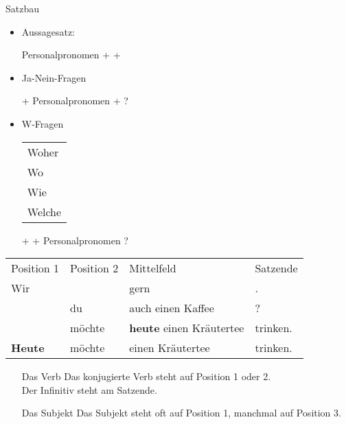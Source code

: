 \begin{syntax}{Satzbau}{}
\begin{itemize}
	\item Aussagesatz:
		\begin{mdframed}
			Personalpronomen + \verbhere + \fillhere
		\end{mdframed}
	\item Ja-Nein-Fragen
		\begin{mdframed}
			\verbhere + Personalpronomen + \fillhere ?
		\end{mdframed}
	\item W-Fragen
		\begin{mdframed}
			\begin{tabular}{l}
				Woher \\
				Wo \\
				Wie \\
				Welche
			\end{tabular} + \verbhere + Personalpronomen ?
		\end{mdframed}
\end{itemize}

\begin{example}
\begin{tabular}{l|l|l|l}
	Position 1 & Position 2 & Mittelfeld & Satzende \\
	\bline
	Wir				& \att{möchten}	& gern								& \att{zahlen}. \\
	\att{Möchtest}	& du			& auch einen Kaffee					& \att{trinken}? \\
	\hline
	\att{Klaus}		& möchte		& \textbf{heute} einen Kräutertee	& trinken. \\
	\textbf{Heute}	& möchte		& \att{Klaus} einen Kräutertee		& trinken.
\end{tabular}
\end{example}
\begin{itemize}
	\item[Das Verb] Das konjugierte Verb steht auf Position 1 oder 2. \\
		Der Infinitiv steht am Satzende.
	\item[Das Subjekt] Das Subjekt steht oft auf Position 1, manchmal auf Position 3.
\end{itemize}
\end{syntax}
